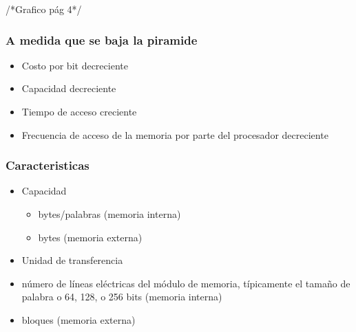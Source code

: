 /*Grafico pág 4*/

\subsubsection{A medida que se baja la piramide}
	\begin{itemize}
	\item Costo por bit decreciente
	\item Capacidad decreciente
	\item Tiempo de acceso creciente
	\item Frecuencia de acceso de la memoria por parte del procesador decreciente
	\end{itemize}

\subsubsection{Caracteristicas}
	\begin{itemize}
	\item Capacidad
		\begin{itemize}
		\item bytes/palabras (memoria interna)
		\item bytes (memoria externa)
		\end{itemize}
	\item Unidad de transferencia
		\item número de líneas eléctricas del módulo de memoria, típicamente el tamaño de palabra o 64, 128, o 256 bits (memoria interna)
		\item bloques (memoria externa)
	\end{itemize}
	
